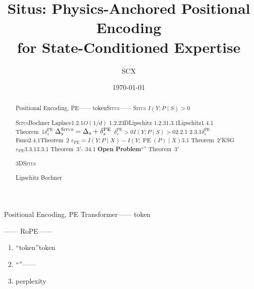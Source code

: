 \documentclass[11pt,a4paper]{article}
\title{\textbf{\LARGE Situs: Physics-Anchored Positional Encoding\\for State-Conditioned Expertise}}
\author{SCX}
\date{\today}
\theoremstyle{remark}
\DeclareMathOperator{\PE}{PE}
\newcommand{\Situs}{\textsc{Situs}}
\begin{document}
\maketitle

\begin{abstract}
Positional Encoding, PE——
token\Situs{}——
\textbf{}
\Situs{}
$I(Y; P \mid S) > 0$

\Situs{}\textbf{}Bochner
Laplace1.2.1$O(1/d)$
1.2.23DLipschitz
1.2.31.3.1Lipschitz1.4.1
\textbf{}Theorem~1$\delta_s^{\PE}$
$\Delta_s^{\Situs} = \Delta_s + \delta_s^{\PE}$
$\delta_s^{\PE} > 0$$I(Y; P \mid S) > 0$2.2.1
2.3.1$\delta_s^{\PE}$
Fano2.4.1\textbf{}Theorem~2
$\varepsilon_{\PE} = I(Y; P \mid X) - I(Y; \PE(P) \mid X)$3.1
Theorem~$2'$KSG
$\varepsilon_{\PE}$3.3.13.3.1
\textbf{}Theorem~$3'$-
34.1
\textbf{Open Problem}``''
Theorem~$3'$


3D\Situs{}



\textbf{}Lipschitz
Bochner
\end{abstract}

\section{}

\subsection{}

Positional Encoding, PE
Transformer——\textbf{}
\textbf{}token
\cite{vaswani2017attention}

——\cite{vaswani2017attention}
RoPE\cite{su2024roformer}\cite{devlin2019bert}——
\textbf{}

\begin{enumerate}[label=(\roman*)]
    \item 
          ``token''token
    \item ``''\textbf{}——
          
    \item perplexity
          
\end{enumerate}
\end{document}
